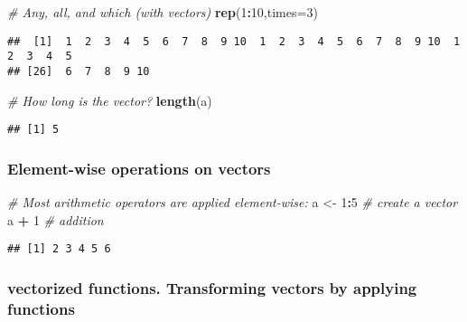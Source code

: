 \documentclass[
]{article}
\newenvironment{Shaded}{\begin{snugshade}}{\end{snugshade}}
\newcommand{\CommentTok}[1]{\textcolor[rgb]{0.56,0.35,0.01}{\textit{#1}}}
\newcommand{\DataTypeTok}[1]{\textcolor[rgb]{0.13,0.29,0.53}{#1}}
\newcommand{\DecValTok}[1]{\textcolor[rgb]{0.00,0.00,0.81}{#1}}
\newcommand{\KeywordTok}[1]{\textcolor[rgb]{0.13,0.29,0.53}{\textbf{#1}}}
\newcommand{\NormalTok}[1]{#1}
\newcommand{\OperatorTok}[1]{\textcolor[rgb]{0.81,0.36,0.00}{\textbf{#1}}}
\newcommand{\StringTok}[1]{\textcolor[rgb]{0.31,0.60,0.02}{#1}}
\begin{document}
\begin{Shaded}
\begin{Highlighting}[]
\CommentTok{# Any, all, and which (with vectors)}
\KeywordTok{rep}\NormalTok{(}\DecValTok{1}\OperatorTok{:}\DecValTok{10}\NormalTok{,}\DataTypeTok{times=}\DecValTok{3}\NormalTok{)}
\end{Highlighting}
\end{Shaded}

\begin{verbatim}
##  [1]  1  2  3  4  5  6  7  8  9 10  1  2  3  4  5  6  7  8  9 10  1  2  3  4  5
## [26]  6  7  8  9 10
\end{verbatim}

\begin{Shaded}
\begin{Highlighting}[]
\CommentTok{# How long is the vector?}
\KeywordTok{length}\NormalTok{(a)}
\end{Highlighting}
\end{Shaded}

\begin{verbatim}
## [1] 5
\end{verbatim}

\hypertarget{element-wise-operations-on-vectors}{%
\subsubsection{Element-wise operations on
vectors}\label{element-wise-operations-on-vectors}}

\begin{Shaded}
\begin{Highlighting}[]
\CommentTok{# Most arithmetic operators are applied element-wise:}
\NormalTok{a <-}\StringTok{ }\DecValTok{1}\OperatorTok{:}\DecValTok{5}        \CommentTok{# create a vector}
\NormalTok{a }\OperatorTok{+}\StringTok{ }\DecValTok{1}       \CommentTok{# addition}
\end{Highlighting}
\end{Shaded}

\begin{verbatim}
## [1] 2 3 4 5 6
\end{verbatim}

\hypertarget{vectorized-functions.-transforming-vectors-by-applying-functions}{%
\subsubsection{vectorized functions. Transforming vectors by applying
functions}\label{vectorized-functions.-transforming-vectors-by-applying-functions}}
\end{document}
